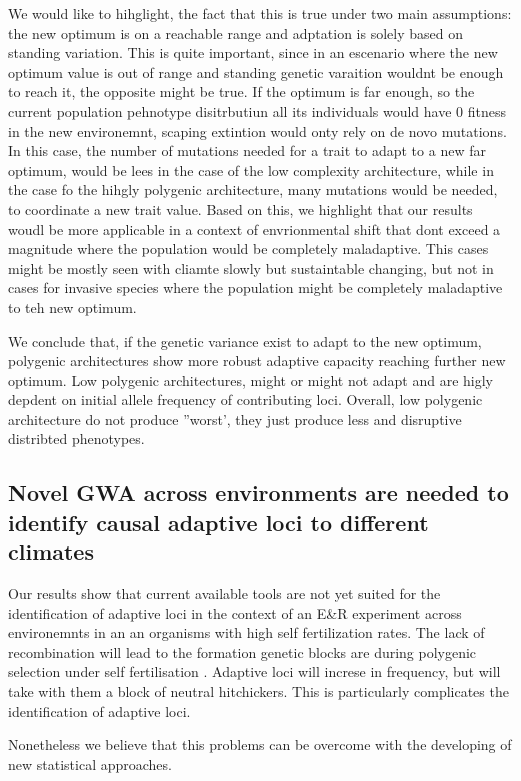 \documentclass{article}
\begin{document}
We would like to hihglight, the fact that this is true under two main assumptions: the new optimum is on a reachable range and adptation is solely based on standing variation. This is quite important, since in an escenario where the new optimum value is out of range and standing genetic varaition wouldnt be enough to reach it, the opposite might be true. If the optimum is far enough, so the current population pehnotype disitrbutiun all its individuals would have 0 fitness in the new environemnt, scaping extintion would onty rely on de novo mutations. In this case, the number of mutations needed for a trait to adapt to a new far optimum, would be lees in the case of the low complexity architecture, while in the case fo the hihgly polygenic architecture, many mutations would be needed, to coordinate a new trait value. Based on this, we highlight that our results woudl be more applicable in a context of envrionmental shift that dont exceed a magnitude where the population would be completely maladaptive. This cases might be mostly seen with cliamte slowly but sustaintable changing, but not in cases for invasive species where the population might be completely maladaptive to teh new optimum. 

We conclude that, if the genetic variance exist to adapt to the new optimum, polygenic architectures show more robust adaptive capacity reaching further new optimum. Low polygenic architectures, might or might not adapt and are higly depdent on initial allele frequency of contributing loci. Overall, low polygenic architecture do not produce ''worst', they just produce less and disruptive distribted phenotypes. 

\subsection{Novel GWA across environments are needed to identify causal adaptive loci to different climates}

Our results show that current available tools are not yet suited for the identification of adaptive loci in the context of an E\&R experiment across environemnts in an an organisms with high self fertilization rates. 
The lack of recombination will lead to the formation genetic blocks are during polygenic selection under self fertilisation \citep{Hartfield2022-nc}. Adaptive loci will increse in frequency, but will take with them a block of neutral hitchickers. This is particularly complicates the identification of adaptive loci. 

Nonetheless we believe that this problems can be overcome with the developing of new statistical approaches. 
\end{document}
